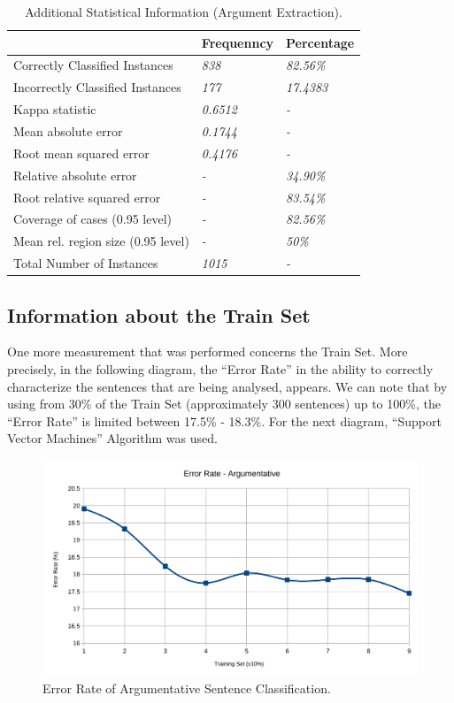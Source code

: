 \begin{table}[H]
\centering
\caption{Additional Statistical Information (Argument Extraction).}
\label{44_table_ref}
\begin{tabular}{lll}
\hline
                                   & {\bf Frequenncy} & {\bf Percentage} \\ \hline
Correctly Classified Instances     & {\it 838}        & {\it 82.56\%}    \\
Incorrectly Classified Instances   & {\it 177}        & {\it 17.4383}    \\
Kappa statistic                    & {\it 0.6512}     & {\it -}          \\
Mean absolute error                & {\it 0.1744}     & {\it -}          \\
Root mean squared error            & {\it 0.4176}     & {\it -}          \\
Relative absolute error            & {\it -}          & {\it 34.90\%}    \\
Root relative squared error        & {\it -}          & {\it 83.54\%}    \\
Coverage of cases (0.95 level)     & {\it -}          & {\it 82.56\%}    \\
Mean rel. region size (0.95 level) & {\it -}          & {\it 50\%}       \\
Total Number of Instances          & {\it 1015}       & {\it -}          \\ \hline
\end{tabular}
\end{table}


\subsection{Information about the Train Set}\label{413_ref}
One more measurement that was performed concerns the Train Set. More precisely, in the following diagram, the ``Error Rate'' in the ability to correctly characterize the sentences that are being analysed, appears. We can note that by using from 30\% of the Train Set (approximately 300 sentences) up to 100\%, the ``Error Rate'' is limited between 17.5\% - 18.3\%. For the next diagram, ``Support Vector Machines'' Algorithm was used.

\begin{figure}[H]
\centering
\includegraphics[width=1\linewidth]{figure/arguments/errorRate-argumentative}
\caption{Error Rate of Argumentative Sentence Classification.}
\end{figure}

